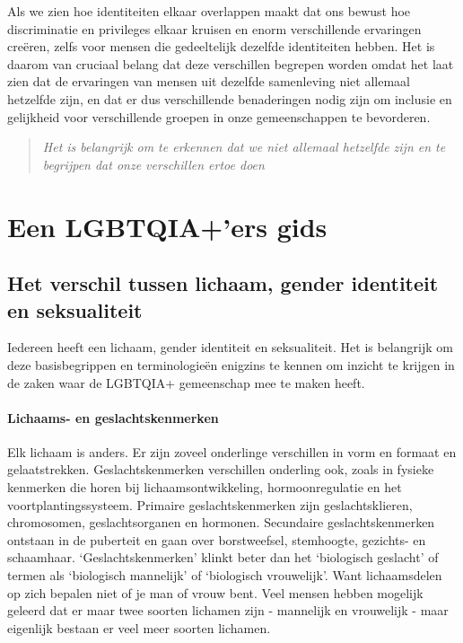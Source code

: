 \documentclass[12pt,openany]{book}
\begin{document}
Als we zien hoe identiteiten elkaar overlappen maakt dat ons bewust hoe discriminatie en privileges elkaar kruisen en enorm verschillende ervaringen creëren, zelfs voor mensen die gedeeltelijk dezelfde identiteiten hebben. Het is daarom van cruciaal belang dat deze verschillen begrepen worden omdat het laat zien dat de ervaringen van mensen uit dezelfde samenleving niet allemaal hetzelfde zijn, en dat er dus verschillende benaderingen nodig zijn om inclusie  en gelijkheid voor verschillende groepen in onze gemeenschappen te bevorderen.

\begin{quote}
\textit{Het is belangrijk om te erkennen dat we niet allemaal hetzelfde zijn en te begrijpen dat onze verschillen ertoe doen}
\end{quote}

\chapter*{Een LGBTQIA+’ers gids}

\section*{Het verschil tussen lichaam, gender identiteit en seksualiteit}

Iedereen heeft een lichaam, gender identiteit en seksualiteit. Het is belangrijk om deze basisbegrippen en terminologieën enigzins te kennen om inzicht te krijgen in de zaken waar de LGBTQIA+ gemeenschap mee te maken heeft.

\subsubsection*{Lichaams- en geslachtskenmerken}

Elk lichaam is anders. Er zijn zoveel onderlinge verschillen in vorm en formaat en gelaatstrekken. Geslachtskenmerken verschillen onderling ook, zoals in fysieke kenmerken die horen bij lichaamsontwikkeling, hormoonregulatie en het voortplantingssysteem. Primaire geslachtskenmerken zijn geslachtsklieren, chromosomen, geslachtsorganen en hormonen. Secundaire geslachtskenmerken ontstaan in de puberteit en gaan over borstweefsel, stemhoogte, gezichts- en schaamhaar. ‘Geslachtskenmerken’ klinkt beter dan het ‘biologisch geslacht’ of termen als ‘biologisch mannelijk’ of ‘biologisch vrouwelijk’. Want lichaamsdelen op zich bepalen niet of je man of vrouw bent. Veel mensen hebben mogelijk geleerd dat er maar twee soorten lichamen zijn - mannelijk en vrouwelijk - maar eigenlijk bestaan er veel meer soorten lichamen.
\end{document}
